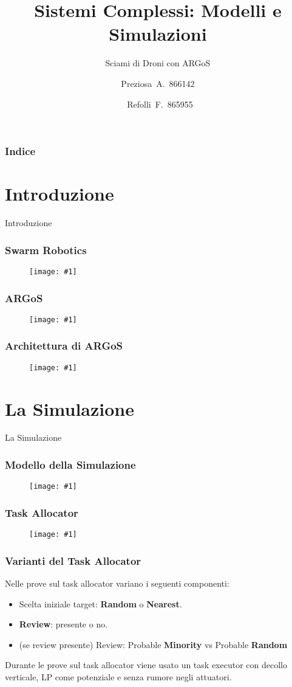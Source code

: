 \documentclass{beamer}
\title{Sistemi Complessi: Modelli e Simulazioni}
\subtitle{Sciami di Droni con ARGoS}
\author{Preziosa~A.~866142 \and ~Refolli~F.~865955}
\newcommand{\putimage}[2] {
  \begin{figure}[H]
    \centering
    \texttt{[image: \#1]}
	\end{figure}
}
\begin{document}
\frame{\titlepage}

\begin{frame}
\frametitle{Indice}
\tableofcontents
\end{frame}

\section{Introduzione}
\begin{frame}
\centering
\Huge
Introduzione
\end{frame}

\begin{frame}
\frametitle{Swarm Robotics}
  \putimage{images/swarm\_robotics.png}{0.99}
\end{frame}

\begin{frame}
\frametitle{ARGoS}
\putimage{images/argos3.png}{0.85}
\end{frame}

\begin{frame}
\frametitle{Architettura di ARGoS}
\putimage{images/architecture.png}{0.85}
\end{frame}

\section{La Simulazione}
\begin{frame}
\centering
\Huge
La Simulazione
\end{frame}

\begin{frame}
\frametitle{Modello della Simulazione}
\putimage{images/simulation-model.png}{0.99}
\end{frame}

\begin{frame}
\frametitle{Task Allocator}
\putimage{images/task-allocator.png}{0.70}
\end{frame}

\begin{frame}
\frametitle{Varianti del Task Allocator}
Nelle prove sul task allocator variano i seguenti componenti:

\begin{itemize}
  \item Scelta iniziale target: \textbf{Random} o \textbf{Nearest}.
  \item \textbf{Review}: presente o no.
  \item (se review presente) Review: Probable \textbf{Minority} vs Probable \textbf{Random}
\end{itemize}

Durante le prove sul task allocator viene usato un task executor con decollo verticale, LP come potenziale e senza rumore negli attuatori.
\end{frame}
\end{document}
